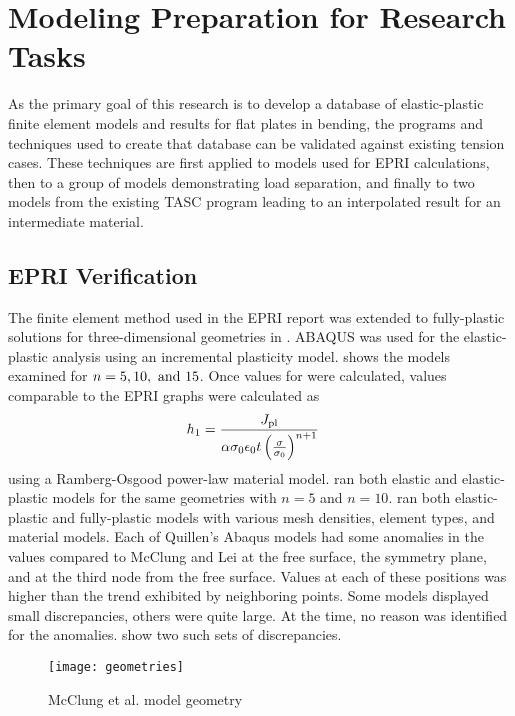 \chapter{Modeling Preparation for Research Tasks}
\label{chap:verification-tensile-sc}
As the primary goal of this research is to develop a database of elastic-plastic finite element models and results for flat plates in bending, the programs and techniques used to create that database can be validated against existing tension cases.
These techniques are first applied to models used for EPRI \hone calculations, then to a group of models demonstrating load separation, and finally to two models from the existing TASC program leading to an interpolated result for an intermediate material.

\section{EPRI \hone Verification}
\label{sec:h1-verification}

The finite element method used in the EPRI report \citep{epri1981} was extended to fully-plastic \J solutions for three-dimensional geometries in \citet{mcclung1999}.
ABAQUS was used for the elastic-plastic analysis using an incremental plasticity model.
 shows the models examined for \(n=5, 10, \textnormal{ and } 15\).
Once values for \Jpl were calculated, \hone values comparable to the EPRI graphs were calculated as
\begin{align}
h_1 &= \frac{J_\textnormal{pl}}{\alpha \sigma_0 \epsilon_0 t \left( \frac{\sigma}{\sigma_0}\right)^{n+1}} \label{eq:h1mcclung}
\end{align}
using a Ramberg-Osgood power-law material model.
\citet{lei2004} ran both elastic and elastic-plastic models for the same geometries with \(n=5\) and \(n=10\).
\citet{quillen2005} ran both elastic-plastic and fully-plastic models with various mesh densities, element types, and material models.
Each of Quillen's Abaqus models had some anomalies in the \hone values compared to McClung and Lei at the free surface, the symmetry plane, and at the third node from the free surface.
Values at each of these positions was higher than the trend exhibited by neighboring points.
Some models displayed small discrepancies, others were quite large.
At the time, no reason was identified for the anomalies.  show two such sets of discrepancies.

\begin{figure}[tbp]
    \centering
    \texttt{[image: geometries]}
    \caption{McClung et al. model geometry \label{fig:geometries}}
\end{figure}

